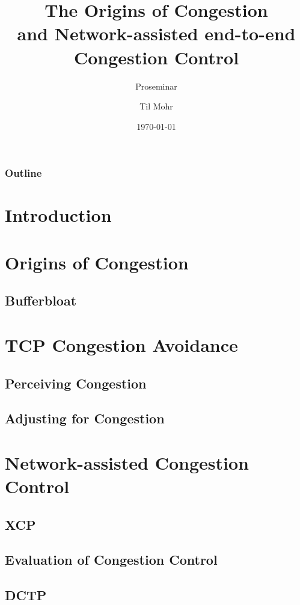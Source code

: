 \documentclass[english,aspectratio=43,t]{beamer}
\title[Cool]{The Origins of Congestion\\and Network-assisted end-to-end\\Congestion Control}
\author{Til Mohr}
\subtitle{Proseminar}
\date{\today}
\begin{document}
\titleframe


\begin{frame}
	\frametitle{Outline}
	\tableofcontents
\end{frame}

\section{Introduction}
\label{sec:intro}

\section{Origins of Congestion}
\label{sec:oc}

\subsection*{Bufferbloat}
\label{sec:bb}

\section{TCP Congestion Avoidance}
\label{sec:ca}

\subsection*{Perceiving Congestion}
\label{sec:pc}

\subsection*{Adjusting for Congestion}
\label{sec:ac}

\section{Network-assisted Congestion Control}
\label{sec:cc}

\subsection{XCP}
\label{sec:xcp}

\subsection{Evaluation of Congestion Control}
\label{sec:eval}

\subsection{DCTP}
\label{sec:dctp}
\end{document}
